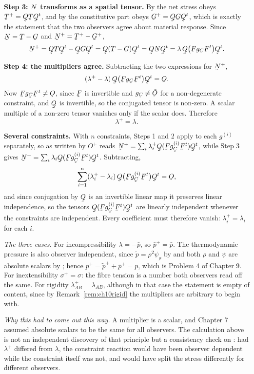 \begin{solution}
\textbf{Step 3: $\bN$ transforms as a spatial tensor.} By  the
net stress obeys $\bT^{+}=\bQ\bT\bQ^{t}$, and by  the
constitutive part obeys $\bG^{+}=\bQ\bG\bQ^{t}$, which is exactly the
statement that the two observers agree about material response. Since
$\bN=\bT-\bG$ and $\bN^{+}=\bT^{+}-\bG^{+}$,
\[
   \bN^{+}=\bQ\bT\bQ^{t}-\bQ\bG\bQ^{t}=\bQ(\bT-\bG)\bQ^{t}
   =\bQ\bN\bQ^{t}
   =\lambda\,\bQ\big(\bF g_{\bC}\bF^{t}\big)\bQ^{t}.
\]

\textbf{Step 4: the multipliers agree.} Subtracting the two expressions
for $\bN^{+}$,
\[
   (\lambda^{+}-\lambda)\,\bQ\big(\bF g_{\bC}\bF^{t}\big)\bQ^{t}=\Ob .
\]
Now $\bF g_{\bC}\bF^{t}\neq\Ob$, since $\bF$ is invertible and
$g_{\bC}\neq\hOb$ for a non-degenerate constraint, and $\bQ$ is
invertible, so the conjugated tensor is non-zero. A scalar multiple of a
non-zero tensor vanishes only if the scalar does. Therefore
\[
   \boxed{\ \lambda^{+}=\lambda .\ }
\]

\textbf{Several constraints.} With $n$ constraints, Steps 1 and 2 apply
to each $g^{(i)}$ separately, so  as written by $O^{+}$ reads
$\bN^{+}=\sum_{i}\lambda^{+}_{i}\bQ(\bF g^{(i)}_{\bC}\bF^{t})\bQ^{t}$,
while Step 3 gives $\bN^{+}=\sum_{i}\lambda_{i}\bQ(\bF
g^{(i)}_{\bC}\bF^{t})\bQ^{t}$. Subtracting,
\[
   \sum_{i=1}^{n}(\lambda^{+}_{i}-\lambda_{i})\,
   \bQ\big(\bF g^{(i)}_{\bC}\bF^{t}\big)\bQ^{t}=\Ob ,
\]
and since conjugation by $\bQ$ is an invertible linear map it preserves
linear independence, so the tensors
$\bQ(\bF g^{(i)}_{\bC}\bF^{t})\bQ^{t}$ are linearly independent whenever
the constraints are independent. Every coefficient must therefore vanish:
$\lambda^{+}_{i}=\lambda_{i}$ for each $i$.

\emph{The three cases.} For incompressibility $\lambda=-\bar p$, so
$\bar p^{+}=\bar p$. The thermodynamic pressure is also observer
independent, since $\tilde p=\rho^{2}\psi_{\rho}$ by  and both
$\rho$ and $\psi$ are absolute scalars by ; hence
$p^{+}=\tilde p^{+}+\bar p^{+}=p$, which is Problem 4 of Chapter 9. For
inextensibility $\sigma^{+}=\sigma$: the fibre tension is a number both
observers read off the same. For rigidity $\lambda^{+}_{AB}
=\lambda_{AB}$, although in that case the statement is empty of content,
since by Remark~\ref{rem:ch10rigid} the multipliers are arbitrary to
begin with.

\emph{Why this had to come out this way.} A multiplier is a scalar, and
Chapter 7 assumed absolute scalars to be the same for all observers. The
calculation above is not an independent discovery of that principle but a
consistency check on : had $\lambda^{+}$ differed from
$\lambda$, the constraint reaction would have been observer dependent
while the constraint itself was not, and  would have split the
stress differently for different observers.
\end{solution}

